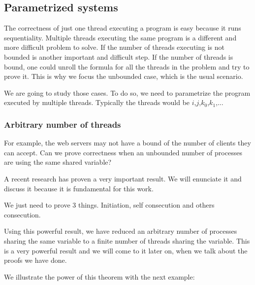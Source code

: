 \subsection{Parametrized systems}

The correctness of just one thread executing a program is easy because it runs sequentiality.
%
Multiple threads executing the same program is a different and more difficult problem to solve.
%
If the number of threads executing is not bounded is another important and difficult step.
%
If the number of threads is bound, one could unroll the formula for all the threads in the problem and try to prove it. 
%
This is why we focus the unbounded case, which is the usual scenario.


We are going to study those cases. 
%
To do so, we need to parametrize the program executed by multiple threads. Typically the threads would be $i$,$j$,$k_0$,$k_1$,... 



\subsubsection{Arbitrary number of threads}


For example, the web servers may not have a bound of the number of clients they can accept.
%
Can we prove correctness when an unbounded number of processes are using the same shared variable?

A recent research  has proven a very important result. 
%
We will enunciate it and discuss it because it is fundamental for this work.


\begin{itheorem}
We just need to prove 3 things. Initiation, self consecution and others consecution.
\end{itheorem}
\label{thm:biggest}

Using this powerful result, we have reduced an arbitrary number of processes sharing the same variable to a finite number of threads sharing the variable. 
%
This is a very powerful result and we will come to it later on, when we talk about the proofs we have done. 

We illustrate the power of this theorem with the next example:

\begin{example}
\end{example}


